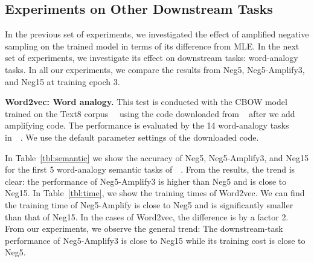\subsection{Experiments on Other Downstream Tasks}\label{sec:realworld}
In the previous set of experiments, we investigated the effect of amplified negative sampling on the trained model in terms of its difference from MLE. In the next set of experiments, we investigate its effect on  downstream tasks: word-analogy tasks. In all our experiments, we compare the results from Neg5, Neg5-Amplify3, and Neg15 at training epoch 3. 

\textbf{Word2vec: Word analogy.} This test is conducted with the CBOW model trained on the Text8 corpus~~\citep{mikolov2013distributed} using the code downloaded from ~\citep{word2vecGithub} after we add amplifying code. The performance is evaluated by the 14 word-analogy tasks in~~\citep{mikolov2013distributed}. We use the default parameter settings of the downloaded code.

%

In Table~\ref{tbl:semantic} we show the accuracy of Neg5, Neg5-Amplify3, and Neg15 for the first 5 word-analogy semantic tasks of~~\citep{mikolov2013distributed}. From the results, the trend is clear: the performance of Neg5-Amplify3 is higher than Neg5 and is close to Neg15. In Table~\ref{tbl:time}, we show the training times of Word2vec. We can find the training time of Neg5-Amplify is close to Neg5 and is significantly smaller than that of Neg15. In the cases of Word2vec, the difference is by a factor 2. 
From our  experiments, we observe the  general trend: The downstream-task performance of Neg5-Amplify3 is close to Neg15 while its training cost is close to Neg5. 

